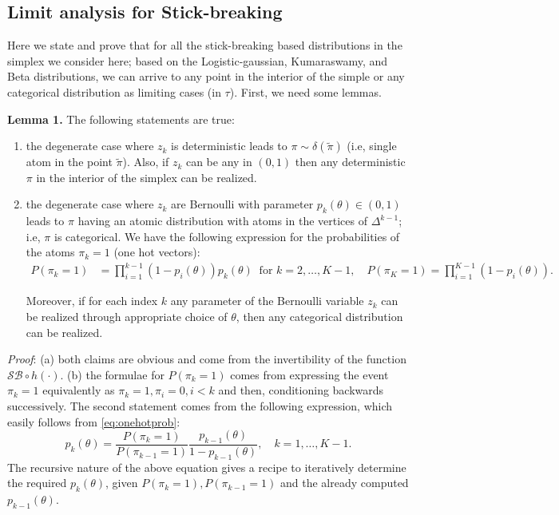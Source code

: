 \documentclass[twoside]{article}
\begin{document}
\subsection*{Limit analysis for Stick-breaking}

Here we state and prove that for all the stick-breaking based distributions in the simplex we consider here; based on the Logistic-gaussian, Kumaraswamy, and Beta distributions, we can arrive to any point in the interior of the simple or any categorical distribution as limiting cases (in $\tau$). First, we need some lemmas.


\textbf{Lemma 1.}  The following statements are true:
\begin{enumerate} \item the degenerate case where  $z_k$ is deterministic leads to $\pi\sim \delta(\tilde{\pi})$  (i.e, single atom in the point $\tilde{\pi}$). Also, if $z_k$ can be any in $(0,1)$ then any deterministic $\pi$ in the interior of the simplex can be realized.
\item the degenerate case where  $z_k$ are Bernoulli with parameter $p_k(\theta) \in (0,1)$ leads to $\pi$ having an atomic distribution with atoms in the vertices of $\Delta^{k-1}$; i.e, $\pi$ is categorical. We have the following expression for the probabilities of the atoms $\pi_k=1$ (one hot vectors):
\begin{align}
\label{eq:onehotprob}
P(\pi_k =1)&= \prod_{i=1}^{k-1} (1-p_i(\theta)) p_k(\theta)  \;\; \text{for } k=2, \ldots, K-1, \quad P(\pi_K =1) = \prod_{i=1}^{K-1} (1-p_i(\theta)).
\end{align}

Moreover, if for each index $k$ any parameter of the Bernoulli variable $z_k$ can be realized through appropriate choice of $\theta$, then any categorical distribution can be realized.

\end{enumerate}
\textit{Proof}: (a) both claims are obvious and come from the invertibility of the function $\mathcal{SB} \circ h (\cdot)$. (b) the formulae for $P(\pi_k =1)$ comes from expressing the event $\pi_k=1$ equivalently as $\pi_k=1,\pi_i=0, i<k$ and then, conditioning backwards successively. The second statement comes from the following expression, which easily follows  from \eqref{eq:onehotprob}:
$$ p_k(\theta)=\frac{P(\pi_k =1)}{P(\pi_{k-1} =1)}\frac{p_{k-1}(\theta)}{1-p_{k-1}(\theta)},\quad k =1,\ldots, K-1.$$
The recursive nature of the above equation gives a recipe to iteratively determine the required $p_k(\theta)$, given  $P(\pi_k =1), P(\pi_{k-1} =1)$ and the already computed $p_{k-1}(\theta)$.
\end{document}
